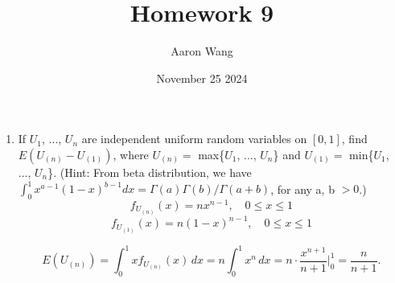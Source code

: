 \documentclass{article}
\title{Homework 9}
\author{Aaron Wang}
\date{November 25 2024}
\begin{document}
\maketitle
\begin{enumerate}
    \item If $U_1$, ..., $U_n$ are independent uniform random variables on $[0,1]$, find $E(U_{(n)}-
U_{(1)})$, where $U_{(n)} =$ max\{$U_1$, ..., $U_n$\} and $U_{(1)} = $ min\{$U_1$, ..., $U_n$\}. (Hint: From beta distribution, we have $\int_0^1 x^{a-1}(1 - x)^{b-1}dx = \Gamma(a)\Gamma(b)/\Gamma(a + b)$, for any a, b $> 0$.)
\[
f_{U_{(n)}}(x) = n x^{n-1}, \quad 0 \leq x \leq 1
\]
\[
f_{U_{(1)}}(x) = n (1 - x)^{n-1}, \quad 0 \leq x \leq 1
\]

\[
E(U_{(n)}) = \int_0^1 x f_{U_{(n)}}(x) \, dx = n \int_0^1 x^n \, dx = n \cdot \frac{x^{n+1}}{n+1}\Bigg|_0^1 = \frac{n}{n+1}.
\]


\end{enumerate}
\end{document}
